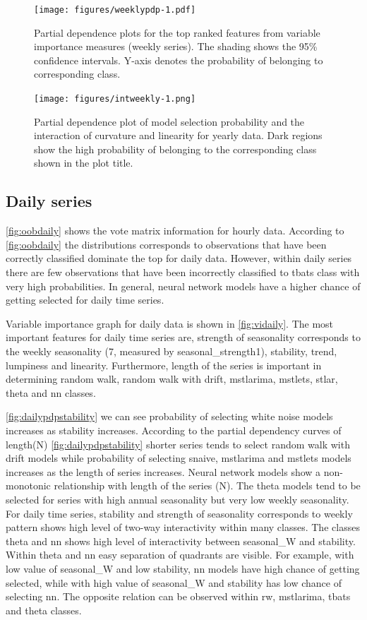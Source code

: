 \documentclass[11pt,a4paper,]{article}
\begin{document}
\begin{figure}
\centering
\texttt{[image: figures/weeklypdp-1.pdf]}
\caption{\label{fig:weeklypdp}Partial dependence plots for the top ranked features from variable importance measures (weekly series). The shading shows the 95\% confidence intervals. Y-axis denotes the probability of belonging to corresponding class.}
\end{figure}

\begin{figure}
\centering
\texttt{[image: figures/intweekly-1.png]}
\caption{\label{fig:intweekly}Partial dependence plot of model selection probability and the interaction of curvature and linearity for yearly data. Dark regions show the high probability of belonging to the corresponding class shown in the plot title.}
\end{figure}

\hypertarget{daily-series}{%
\subsection{Daily series}\label{daily-series}}

\autoref{fig:oobdaily} shows the vote matrix information for hourly data. According to \autoref{fig:oobdaily} the distributions corresponds to observations that have been correctly classified dominate the top for daily data. However, within daily series there are few observations that have been incorrectly classified to tbats class with very high probabilities. In general, neural network models have a higher chance of getting selected for daily time series.

Variable importance graph for daily data is shown in \autoref{fig:vidaily}. The most important features for daily time series are, strength of seasonality corresponds to the weekly seasonality (7, measured by seasonal\_strength1), stability, trend, lumpiness and linearity. Furthermore, length of the series is important in determining random walk, random walk with drift, mstlarima, mstlets, stlar, theta and nn classes.

\autoref{fig:dailypdpstability} we can see probability of selecting white noise models increases as stability increases. According to the partial dependency curves of length(N)
\autoref{fig:dailypdpstability} shorter series tends to select random walk with drift models while probability of selecting snaive, mstlarima and mstlets models increases as the length of series increases. Neural network models show a non-monotonic relationship with length of the series (N). The theta models tend to be selected for series with high annual seasonality but very low weekly seasonality. For daily time series, stability and strength of seasonality corresponds to weekly pattern shows high level of two-way interactivity within many classes. The classes theta and nn shows high level of interactivity between seasonal\_W and stability. Within theta and nn easy separation of quadrants are visible. For example, with low value of seasonal\_W and low stability, nn models have high chance of getting selected, while with high value of seasonal\_W and stability has low chance of selecting nn. The opposite relation can be observed within rw, mstlarima, tbats and theta classes.
\end{document}
